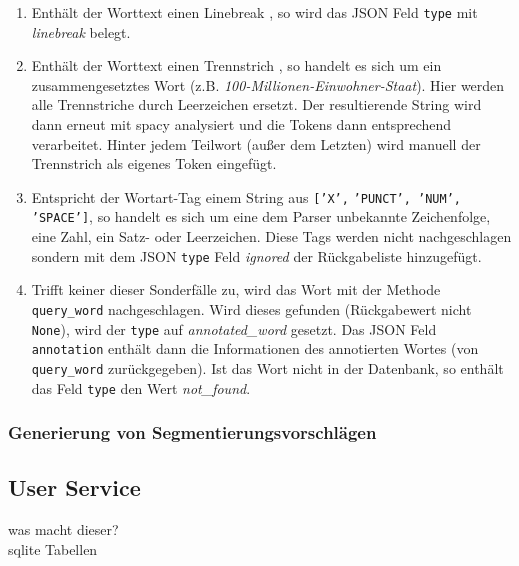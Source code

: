 \begin{itemize}
\begin{enumerate}
	\item Enthält der Worttext einen Linebreak , so wird das JSON Feld \texttt{type} mit \textit{linebreak} belegt.
	
	\item Enthält der Worttext einen Trennstrich \qq{\texttt{-}}, so handelt es sich um ein zusammengesetztes Wort (z.B. \textit{100-Millionen-Einwohner-Staat}). Hier werden alle Trennstriche durch Leerzeichen ersetzt. Der resultierende String wird dann erneut mit spacy analysiert und die Tokens dann entsprechend verarbeitet. Hinter jedem Teilwort (außer dem Letzten) wird manuell der Trennstrich als eigenes Token eingefügt.
	
	\item Entspricht der Wortart-Tag einem String aus \texttt{['X',} \texttt{'PUNCT', }\texttt{'NUM', }\\
	\texttt{'SPACE']}, so handelt es sich um eine dem Parser unbekannte Zeichenfolge, eine Zahl, ein Satz- oder Leerzeichen. Diese Tags werden nicht nachgeschlagen sondern mit dem JSON \texttt{type} Feld \textit{ignored} der Rückgabeliste hinzugefügt.
	
	\item Trifft keiner dieser Sonderfälle zu, wird das Wort mit der Methode \texttt{query\_word} nachgeschlagen. Wird dieses gefunden (Rückgabewert nicht \texttt{None}), wird der \texttt{type} auf \textit{annotated\_word} gesetzt. Das JSON Feld \texttt{annotation} enthält dann die Informationen des annotierten Wortes (von \texttt{query\_word} zurückgegeben). Ist das Wort nicht in der Datenbank, so enthält das Feld \texttt{type} den Wert \textit{not\_found}.
\end{enumerate}

\end{itemize}

\subsubsection{Generierung von Segmentierungsvorschlägen}

\subsection{User Service}
\label{sec:userservice}

was macht dieser?\\
sqlite Tabellen\\

